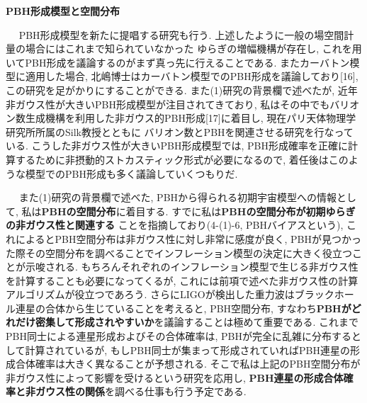 \documentclass[11pt,a4paper,twoside]{jarticle}
\renewcommand{\emph}[1]{{\sffamily\gtfamily\bfseries #1}}
\newcommand{\subject}[1]{\noindent{\sffamily\gtfamily\bfseries #1}~~}
\newcommand{\研究課題名}{\mgfamily\sffamily インフレーション宇宙における曲率ゆらぎと原始ブラックホール形成}
\newcommand{\研究機関名}{\mgfamily\sffamily Institut d'Astrophysique de Paris}
\newcommand{\申請者氏名}{\mgfamily\sffamily 多田祐一郎}
\newcommand{\研究代表者氏名}{\申請者氏名}
\newcommand{\研究期間の最終元号年度}{32}	%
\begin{document}
{	
	
	
	
	
	
	
	\begin{mdframed}[roundcorner=0.5zw,
	innertopmargin=0.8zw,innerbottommargin=0.8zw,
	linecolor=black!50,linewidth=0.2zw,
	backgroundcolor=black!10]
	{\bfseries\gtfamily\sffamily\large PBH形成模型と空間分布}
	\end{mdframed}
	
	\subject{3. PBH形成模型}
	PBH形成模型を新たに提唱する研究も行う. 上述したように一般の場空間計量の場合にはこれまで知られていなかった
	ゆらぎの増幅機構が存在し, これを用いてPBH形成を議論するのがまず真っ先に行えることである.
	またカーバトン模型に適用した場合, 北嶋博士はカーバトン模型でのPBH形成を議論しており[16],
	この研究を足がかりにすることができる.
	また(1)研究の背景欄で述べたが, 近年非ガウス性が大きいPBH形成模型が注目されてきており,
	私はその中でもバリオン数生成機構を利用した非ガウス的PBH形成[17]に着目し, 現在パリ天体物理学研究所所属のSilk教授とともに
	バリオン数とPBHを関連させる研究を行なっている. こうした非ガウス性が大きいPBH形成模型では,
	PBH形成確率を正確に計算するために非摂動的ストカスティック形式が必要になるので,
	着任後はこのような模型でのPBH形成も多く議論していくつもりだ.
	\vspace{3pt}
	
	\subject{4. PBH空間分布}
	また(1)研究の背景欄で述べた, PBHから得られる初期宇宙模型への情報として,
	私は\emph{PBHの空間分布}に着目する. すでに私は\emph{PBHの空間分布が初期ゆらぎの非ガウス性と関連する}
	ことを指摘しており(4-(1)-6, PBHバイアスという), これによるとPBH空間分布は非ガウス性に対し非常に感度が良く,
	PBHが見つかった際その空間分布を調べることでインフレーション模型の決定に大きく役立つことが示唆される.
	もちろんそれぞれのインフレーション模型で生じる非ガウス性を計算することも必要になってくるが,
	これには前項で述べた非ガウス性の計算アルゴリズムが役立つであろう.
	さらにLIGOが検出した重力波はブラックホール連星の合体から生じていることを考えると,
	PBH空間分布, すなわち\emph{PBHがどれだけ密集して形成されやすいか}を議論することは極めて重要である.
	これまでPBH同士による連星形成およびその合体確率は, PBHが完全に乱雑に分布するとして計算されているが,
	もしPBH同士が集まって形成されていればPBH連星の形成合体確率は大きく異なることが予想される.
	そこで私は上記のPBH空間分布が非ガウス性によって影響を受けるという研究を応用し,
	\emph{PBH連星の形成合体確率と非ガウス性の関係}を調べる仕事も行う予定である.
	
}
\end{document}

